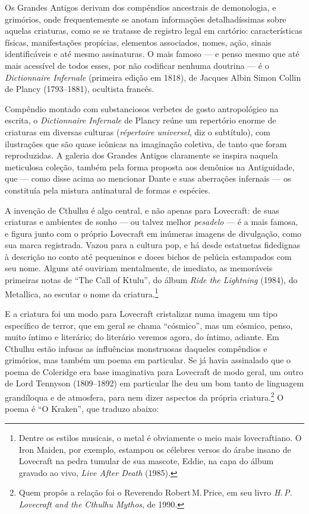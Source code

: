 Os Grandes Antigos derivam dos compêndios ancestrais de demonologia, e
grimórios, onde frequentemente se anotam informações detalhadíssimas
sobre aquelas criaturas, como se se tratasse de registro legal em
cartório: características físicas, manifestações propícias, elementos
associados, nomes, ação, sinais identificáveis e até mesmo assinaturas.
O mais famoso --- e penso mesmo que até mais acessível de todos esses,
por não codificar nenhuma doutrina --- é o \emph{Dictionnaire Infernale}
(primeira edição em 1818), de Jacques Albin Simon Collin de Plancy
(1793--1881), ocultista francês.

Compêndio montado com substanciosos verbetes de gosto antropológico na
escrita, o \emph{Dictionnaire Infernale} de Plancy reúne um repertório
enorme de criaturas em diversas culturas (\emph{répertoire universel},
diz o subtítulo), com ilustrações que são quase icônicas na imaginação
coletiva, de tanto que foram reproduzidas. A galeria dos Grandes Antigos
claramente se inspira naquela meticulosa coleção, também pela forma
proposta aos demônios na Antiguidade, que --- como disse acima ao
mencionar Dante e suas aberrações infernais --- os constituía pela
mistura antinatural de formas e espécies.

A invenção de Cthulhu é algo central, e não apenas para Lovecraft: de
suas criaturas e ambientes de sonho --- ou talvez melhor \emph{pesadelo}
--- é a mais famosa, e figura junto com o próprio Lovecraft em inúmeras
imagens de divulgação, como sua marca registrada. Vazou para a cultura
pop, e há desde estatuetas fidedignas à descrição no conto até
pequeninos e doces bichos de pelúcia estampados com seu nome. Alguns até
ouviriam mentalmente, de imediato, as memoráveis primeiras notas de
``The Call of Ktulu'', do álbum \emph{Ride the Lightning} (1984), do
Metallica, ao escutar o nome da criatura.\footnote{Dentre os estilos
  musicais, o metal é obviamente o meio mais lovecraftiano. O Iron
  Maiden, por exemplo, estampou os célebres versos do árabe insano de
  Lovecraft na pedra tumular de sua mascote, Eddie, na capa do álbum
  gravado ao vivo, \emph{Live After Death} (1985).}

E a criatura foi um modo para Lovecraft cristalizar numa imagem um tipo
específico de terror, que em geral se chama ``cósmico'', mas um cósmico,
penso, muito íntimo e literário; do literário veremos agora, do íntimo,
adiante. Em Cthulhu estão infusas as influências monstruosas daqueles
compêndios e grimórios, mas também um poema em particular. Se já havia
assinalado que o poema de Coleridge era base imaginativa para Lovecraft
de modo geral, um outro de Lord Tennyson (1809--1892) em particular lhe
deu um bom tanto de linguagem grandíloqua e de atmosfera, para nem dizer
aspectos da própria criatura.\footnote{Quem propôs a relação foi o
  Reverendo Robert\,M.\,Price, em seu livro \emph{H.\,P.\,Lovecraft and the
  Cthulhu Mythos}, de 1990.} O poema é ``O Kraken'', que traduzo
abaixo:

